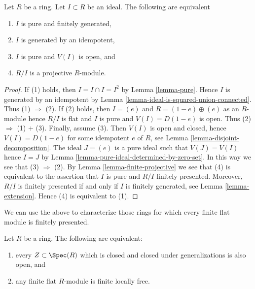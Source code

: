 \begin{lemma}
\label{lemma-finitely-generated-pure-ideal}
Let $R$ be a ring. Let $I \subset R$ be an ideal.
The following are equivalent
\begin{enumerate}
\item $I$ is pure and finitely generated,
\item $I$ is generated by an idempotent,
\item $I$ is pure and $V(I)$ is open, and
\item $R/I$ is a projective $R$-module.
\end{enumerate}
\end{lemma}

\begin{proof}
If (1) holds, then $I = I \cap I = I^2$ by
Lemma \ref{lemma-pure}.
Hence $I$ is generated by an idempotent by
Lemma \ref{lemma-ideal-is-squared-union-connected}.
Thus (1) $\Rightarrow$ (2).
If (2) holds, then $I = (e)$ and $R = (1 - e) \oplus (e)$ as
an $R$-module hence $R/I$ is flat and $I$ is pure and $V(I) = D(1 - e)$
is open. Thus (2) $\Rightarrow$ (1) $+$ (3).
Finally, assume (3). Then $V(I)$ is open and closed, hence
$V(I) = D(1 - e)$ for some idempotent $e$ of $R$, see
Lemma \ref{lemma-disjoint-decomposition}.
The ideal $J = (e)$ is a pure ideal such that $V(J) = V(I)$ hence
$I = J$ by
Lemma \ref{lemma-pure-ideal-determined-by-zero-set}.
In this way we see that (3) $\Rightarrow$ (2). By
Lemma \ref{lemma-finite-projective}
we see that (4) is equivalent to the assertion that $I$ is pure
and $R/I$ finitely presented. Moreover, $R/I$ is finitely presented
if and only if $I$ is finitely generated, see Lemma \ref{lemma-extension}.
Hence (4) is equivalent to (1).
\end{proof}

\noindent
We can use the above to characterize those rings for which every finite
flat module is finitely presented.

\begin{lemma}
\label{lemma-finite-flat-module-finitely-presented}
Let $R$ be a ring. The following are equivalent:
\begin{enumerate}
\item every $Z \subset \Spec(R)$ which is closed and closed under
generalizations is also open, and
\item any finite flat $R$-module is finite locally free.
\end{enumerate}
\end{lemma}

